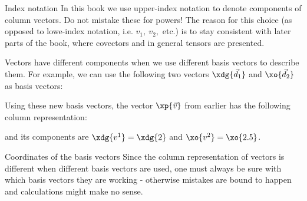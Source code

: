 \begin{note}{Index notation}{}
  In this book we use upper-index notation to denote components of column vectors. Do not mistake these for powers! The reason for this choice (as opposed to lowe-index notation, i.e. $v_{1},\ v_{2},$ etc.) is to stay consistent with later parts of the book, where covectors and in general tensors are presented.
\end{note}

Vectors have different components when we use different basis vectors to describe them. For example, we can use the following two vectors $\xdg{\vec{d}_{1}}$ and $\xo{\vec{d}_{2}}$ as basis vectors:

\begin{center}
\end{center}

Using these new basis vectors, the vector $\xp{\vec{v}}$ from earlier has the following column representation:

\vspace{-1.2em}
\begin{center}
\end{center}
and its components are $\xdg{v^{1}}=\xdg{2}$ and $\xo{v^{2}}=\xo{2.5}$.

\begin{note}{Coordinates of the basis vectors}{}
  Since the column representation of vectors is different when different basis vectors are used, one must always be sure with which basis vectors they are working - otherwise mistakes are bound to happen and calculations might make no sense.
\end{note}

